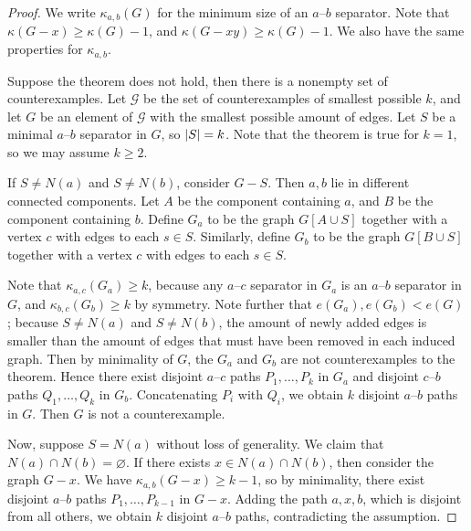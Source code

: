 \begin{proof}
	We write \( \kappa_{a,b}(G) \) for the minimum size of an \( a \)--\( b \) separator.
	Note that \( \kappa(G - x) \geq \kappa(G) - 1 \), and \( \kappa(G - xy) \geq \kappa(G) - 1 \).
	We also have the same properties for \( \kappa_{a,b} \).

	Suppose the theorem does not hold, then there is a nonempty set of counterexamples.
	Let \( \mathcal G \) be the set of counterexamples of smallest possible \( k \), and let \( G \) be an element of \( \mathcal G \) with the smallest possible amount of edges.
	Let \( S \) be a minimal \( a \)--\( b \) separator in \( G \), so \( \abs{S} = k \).
	Note that the theorem is true for \( k = 1 \), so we may assume \( k \geq 2 \).

	If \( S \neq N(a) \) and \( S \neq N(b) \), consider \( G - S \).
	Then \( a, b \) lie in different connected components.
	Let \( A \) be the component containing \( a \), and \( B \) be the component containing \( b \).
	Define \( G_a \) to be the graph \( G[A \cup S] \) together with a vertex \( c \) with edges to each \( s \in S \).
	Similarly, define \( G_b \) to be the graph \( G[B \cup S] \) together with a vertex \( c \) with edges to each \( s \in S \).

	Note that \( \kappa_{a,c}(G_a) \geq k \), because any \( a \)--\( c \) separator in \( G_a \) is an \( a \)--\( b \) separator in \( G \), and \( \kappa_{b,c}(G_b) \geq k \) by symmetry.
	Note further that \( e(G_a), e(G_b) < e(G) \); because \( S \neq N(a) \) and \( S \neq N(b) \), the amount of newly added edges is smaller than the amount of edges that must have been removed in each induced graph.
	Then by minimality of \( G \), the \( G_a \) and \( G_b \) are not counterexamples to the theorem.
	Hence there exist disjoint \( a \)--\( c \) paths \( P_1, \dots, P_k \) in \( G_a \) and disjoint \( c \)--\( b \) paths \( Q_1, \dots, Q_k \) in \( G_b \).
	Concatenating \( P_i \) with \( Q_i \), we obtain \( k \) disjoint \( a \)--\( b \) paths in \( G \).
	Then \( G \) is not a counterexample.

	Now, suppose \( S = N(a) \) without loss of generality.
	We claim that \( N(a) \cap N(b) = \varnothing \).
	If there exists \( x \in N(a) \cap N(b) \), then consider the graph \( G - x \).
	We have \( \kappa_{a,b}(G - x) \geq k - 1 \), so by minimality, there exist disjoint \( a \)--\( b \) paths \( P_1, \dots, P_{k-1} \) in \( G - x \).
	Adding the path \( a, x, b \), which is disjoint from all others, we obtain \( k \) disjoint \( a \)--\( b \) paths, contradicting the assumption.


\end{proof}

